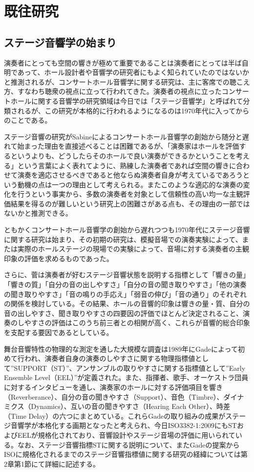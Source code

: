 \documentclass[11pt,a4j]{jreport}
\begin{document}
\section{既往研究}

\subsection*{ステージ音響学の始まり}
演奏者にとっても空間の響きが極めて重要であることは演奏者にとっては半ば自明であって、ホール設計者や音響学の研究者にもよく知られていたのではないかと推測されるが、コンサートホール音響学に関する研究は、主に客席での聴こえ方、すなわち聴衆の視点に立って行われてきた。演奏者の視点に立ったコンサートホールに関する音響学の研究領域は今日では「ステージ音響学」と呼ばれて分類されるが、この研究が本格的に行われるようになるのは1970年代に入ってからのことである。

ステージ音響の研究がSabineによるコンサートホール音響学の創始から随分と遅れて始まった理由を直接述べることは困難であるが、「演奏家はホールを評価するというよりも、どうしたらそのホールで良い演奏ができるかということを考える」という言葉\cite{橘1997}によく表れてように、熟練した演奏者であれば空間の響きに合わせて演奏を適応させるべきであると他ならぬ演奏者自身が考えているであろうという動機の点は一つの理由として考えられる。またこのような適応的な演奏の変化を行うという事実から、多数の演奏者を対象として信頼性の高い均一な主観評価結果を得るのが難しいという研究上の困難さがある点も、その理由の一部ではないかと推測できる。
  
ともかくコンサートホール音響学の創始から遅れつつも1970年代にステージ音響に関する研究は始まり、その初期の研究は、模擬音場での演奏実験によって\cite{marshall1978, nakayama1984, naylor1988}、または実際のホールステージの現場での実験によって\cite{Gade1989II, chiang2003, jeon2005}、音場に対する演奏者の主観印象の評価を求めるものであった。

さらに、菅\cite{suga1986}は演奏者が好むステージ音響状態を説明する指標として「響きの量」「響きの質」「自分の音の出しやすさ」「自分の音の聞き取りやすさ」「他の演奏の聞き取りやすさ」「音の鳴りの手応え」「弱音の伸び」「音の通り」のそれぞれの関係を検討している。その結果、ホールの音響的印象は響きの量・質、自分の音の出しやすさ、聞き取りやすさの四要因の評価でほとんど決定されること、演奏のしやすさの評価はこのうち前三者との相関が高く、これらが音響的総合印象を支配する要因であるとしている。

舞台音響特性の物理的な測定を通した大規模な調査は1989年にGade\cite{Gade1989II}によって初めて行われ、演奏者自身の演奏のしやすさに関する物理指標値として”SUPPORT（ST）”、アンサンブルの取りやすさに関する指標値として”Early Ensemble Level（EEL）”が定義された。また、指揮者、歌手、オーケストラ団員に対するインタビューを通し、演奏家のホールに対する評価項目を響き（Reverberance）、自分の音の聞きやすさ（Support）、音色（Timbre）、ダイナミクス（Dynamics）、互いの音の聞きやすさ（Hearing Each Other）、時差（Time Delay）の六つにまとめている。これらGadeの取り組みの成果がステージ音響学が本格化する画期となったと考えられ、今日ISO3382-1:2009にもSTおよびEELが規格化されており、音響設計やステージ音場の評価に用いられている。なお、ステージ音響指標STに関する説明について、またGadeの提案からISOに規格化されるまでのステージ音響指標値に関する研究の経緯については第2章第1節にて詳細に記述する。
\end{document}
